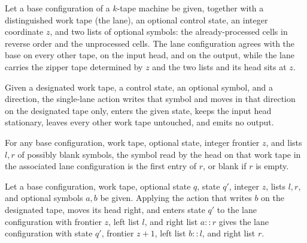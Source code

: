 \begin{definition}
\label{Complexity.laneCfg}
\leanok
{}
Let a base configuration of a $k$-tape machine be given, together with a distinguished
work tape (the lane), an optional control state, an integer coordinate $z$, and two
lists of optional symbols: the already-processed cells in reverse order and the
unprocessed cells.  The lane configuration agrees with the base on every other tape,
on the input head, and on the output, while the lane carries the zipper tape
determined by $z$ and the two lists and its head sits at $z$.
\end{definition}

\begin{definition}
\label{Complexity.laneAction}
\leanok
{}
Given a designated work tape, a control state, an optional symbol, and a direction,
the single-lane action writes that symbol and moves in that direction on the
designated tape only, enters the given state, keeps the input head stationary, leaves
every other work tape untouched, and emits no output.
\end{definition}

\begin{lemma}
\label{Complexity.laneCfg_read}
\leanok
{}
For any base configuration, work tape, optional state, integer frontier $z$, and lists
$l,r$ of possibly blank symbols, the symbol read by the head on that work tape in the
associated lane configuration is the first entry of $r$, or blank if $r$ is empty.
\end{lemma}

\begin{lemma}
\label{Complexity.laneCfg_right}
\leanok
{}
Let a base configuration, work tape, optional state $q$, state $q'$, integer $z$, lists
$l,r$, and optional symbols $a,b$ be given. Applying the action that writes $b$ on the
designated tape, moves its head right, and enters state $q'$ to the lane configuration
with frontier $z$, left list $l$, and right list $a::r$ gives the lane configuration
with state $q'$, frontier $z+1$, left list $b::l$, and right list $r$.
\end{lemma}

